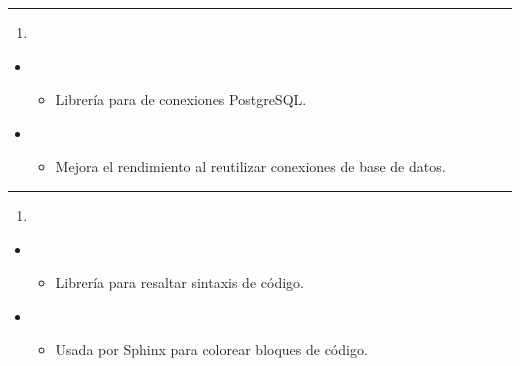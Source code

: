 \documentclass[a4paper,10pt,oneside,spanish,openany]{sphinxmanual}
\begin{document}
\bigskip\hrule\bigskip

\begin{enumerate}
%
\setcounter{enumi}{20}
\item {} 
\sphinxAtStartPar
{}

\end{enumerate}
\begin{itemize}
\item {} 
\sphinxAtStartPar
{}
\begin{itemize}
\item {} 
\sphinxAtStartPar
Librería para  de conexiones PostgreSQL.

\end{itemize}

\item {} 
\sphinxAtStartPar
{}
\begin{itemize}
\item {} 
\sphinxAtStartPar
Mejora el rendimiento al reutilizar conexiones de base de datos.

\end{itemize}

\end{itemize}


\bigskip\hrule\bigskip

\begin{enumerate}
%
\setcounter{enumi}{21}
\item {} 
\sphinxAtStartPar
{}

\end{enumerate}
\begin{itemize}
\item {} 
\sphinxAtStartPar
{}
\begin{itemize}
\item {} 
\sphinxAtStartPar
Librería para resaltar sintaxis de código.

\end{itemize}

\item {} 
\sphinxAtStartPar
{}
\begin{itemize}
\item {} 
\sphinxAtStartPar
Usada por Sphinx para colorear bloques de código.

\end{itemize}

\end{itemize}
\end{document}
